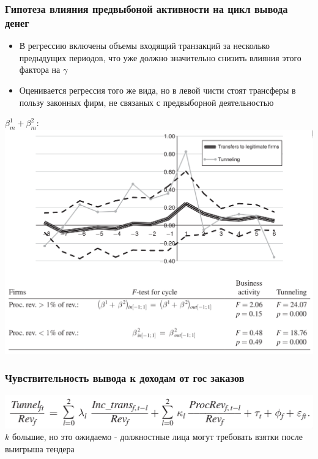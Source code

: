 
\begin{frame}
\frametitle{Гипотеза влияния предвыбоной активности на цикл вывода денег}
\begin{itemize}
	\item В регрессию включены объемы входящий транзакций за несколько предыдущих периодов, что уже должно значительно снизить влияния этого фактора на $\gamma$
	\item Оценивается регрессия того же вида, но в левой чисти стоят трансферы в пользу законных фирм, не связаных с предвыборной деятельностью
\end{itemize}
\end{frame}

\begin{frame}
$\beta^1_m + \beta^2_m$:
\includegraphics[scale=0.25]{images/legit_trans}
\end{frame}

\begin{frame}
\frametitle{Чувствительность вывода к доходам от гос заказов}
\includegraphics[scale=0.3]{images/tunnelling_from_procurement}
$k$ большие, но это ожидаемо - должностные лица могут требовать взятки после выигрыша тендера
\end{frame}

